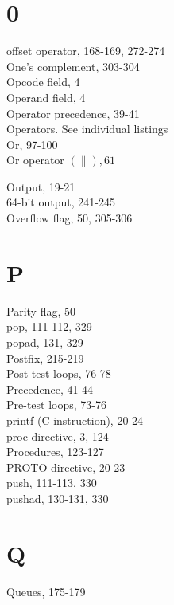 \documentclass[10pt]{article}
\begin{document}
\section*{0}
offset operator, 168-169, 272-274\\
One's complement, 303-304\\
Opcode field, 4\\
Operand field, 4\\
Operator precedence, 39-41\\
Operators. See individual listings\\
Or, 97-100\\
Or operator $(\|), 61$

Output, 19-21\\
64-bit output, 241-245\\
Overflow flag, 50, 305-306

\section*{P}
Parity flag, 50\\
pop, 111-112, 329\\
popad, 131, 329\\
Postfix, 215-219\\
Post-test loops, 76-78\\
Precedence, 41-44\\
Pre-test loops, 73-76\\
printf (C instruction), 20-24\\
proc directive, 3, 124\\
Procedures, 123-127\\
PROTO directive, 20-23\\
push, 111-113, 330\\
pushad, 130-131, 330

\section*{Q}
Queues, 175-179
\end{document}
